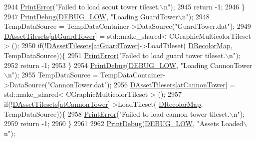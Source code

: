 \begin{DoxyCode}
2944         \hyperlink{Debug_8h_a2ed825eefefe35baf59a93a8c641323d}{PrintError}(\textcolor{stringliteral}{"Failed to load scout tower tileset.\(\backslash\)n"});
2945         \textcolor{keywordflow}{return} -1;
2946     \}
2947     \hyperlink{Debug_8h_aa5f00f5537c9760f6ae1782460748ab9}{PrintDebug}(\hyperlink{Debug_8h_a3a5f3fc09784650d8388cb854882f840}{DEBUG\_LOW}, \textcolor{stringliteral}{"Loading GuardTower\(\backslash\)n"});
2948     TempDataSource = TempDataContainer->DataSource(\textcolor{stringliteral}{"GuardTower.dat"});
2949     \hyperlink{classCApplicationData_a1aaf56a300b30c5e2484a5359366d77a}{DAssetTilesets}[\hyperlink{GameDataTypes_8h_a5600d4fc433b83300308921974477feca65fa6c84ff93972a623793d4ee72d87f}{atGuardTower}] = std::make\_shared< CGraphicMulticolorTileset > 
      ();
2950     \textcolor{keywordflow}{if}(!\hyperlink{classCApplicationData_a1aaf56a300b30c5e2484a5359366d77a}{DAssetTilesets}[\hyperlink{GameDataTypes_8h_a5600d4fc433b83300308921974477feca65fa6c84ff93972a623793d4ee72d87f}{atGuardTower}]->LoadTileset(
      \hyperlink{classCApplicationData_afcbfb5d837afd5c117d91216d1988a53}{DRecolorMap}, TempDataSource))\{
2951         \hyperlink{Debug_8h_a2ed825eefefe35baf59a93a8c641323d}{PrintError}(\textcolor{stringliteral}{"Failed to load guard tower tileset.\(\backslash\)n"});
2952         \textcolor{keywordflow}{return} -1;
2953     \}
2954     \hyperlink{Debug_8h_aa5f00f5537c9760f6ae1782460748ab9}{PrintDebug}(\hyperlink{Debug_8h_a3a5f3fc09784650d8388cb854882f840}{DEBUG\_LOW}, \textcolor{stringliteral}{"Loading CannonTower\(\backslash\)n"});
2955     TempDataSource = TempDataContainer->DataSource(\textcolor{stringliteral}{"CannonTower.dat"});
2956     \hyperlink{classCApplicationData_a1aaf56a300b30c5e2484a5359366d77a}{DAssetTilesets}[\hyperlink{GameDataTypes_8h_a5600d4fc433b83300308921974477feca226f6f1968ce76c97cdabb780a6c289d}{atCannonTower}] = std::make\_shared< CGraphicMulticolorTileset
       > ();
2957     \textcolor{keywordflow}{if}(!\hyperlink{classCApplicationData_a1aaf56a300b30c5e2484a5359366d77a}{DAssetTilesets}[\hyperlink{GameDataTypes_8h_a5600d4fc433b83300308921974477feca226f6f1968ce76c97cdabb780a6c289d}{atCannonTower}]->LoadTileset(
      \hyperlink{classCApplicationData_afcbfb5d837afd5c117d91216d1988a53}{DRecolorMap}, TempDataSource))\{
2958         \hyperlink{Debug_8h_a2ed825eefefe35baf59a93a8c641323d}{PrintError}(\textcolor{stringliteral}{"Failed to load cannon tower tileset.\(\backslash\)n"});
2959         \textcolor{keywordflow}{return} -1;
2960     \}
2961     
2962     \hyperlink{Debug_8h_aa5f00f5537c9760f6ae1782460748ab9}{PrintDebug}(\hyperlink{Debug_8h_a3a5f3fc09784650d8388cb854882f840}{DEBUG\_LOW}, \textcolor{stringliteral}{"Assets Loaded\(\backslash\)n"});

\end{DoxyCode}
